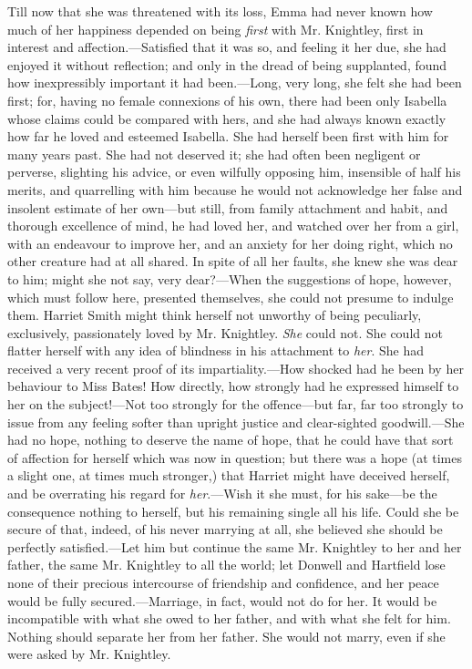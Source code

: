 Till now that she was threatened with its loss, Emma had never known how much of her happiness depended on being {\em first} with Mr. Knightley, first in interest and affection.---Satisfied that it was so, and feeling it her due, she had enjoyed it without reflection; and only in the dread of being supplanted, found how inexpressibly important it had been.---Long, very long, she felt she had been first; for, having no female connexions of his own, there had been only Isabella whose claims could be compared with hers, and she had always known exactly how far he loved and esteemed Isabella. She had herself been first with him for many years past. She had not deserved it; she had often been negligent or perverse, slighting his advice, or even wilfully opposing him, insensible of half his merits, and quarrelling with him because he would not acknowledge her false and insolent estimate of her own---but still, from family attachment and habit, and thorough excellence of mind, he had loved her, and watched over her from a girl, with an endeavour to improve her, and an anxiety for her doing right, which no other creature had at all shared. In spite of all her faults, she knew she was dear to him; might she not say, very dear?---When the suggestions of hope, however, which must follow here, presented themselves, she could not presume to indulge them. Harriet Smith might think herself not unworthy of being peculiarly, exclusively, passionately loved by Mr. Knightley. {\em She} could not. She could not flatter herself with any idea of blindness in his attachment to {\em her}. She had received a very recent proof of its impartiality.---How shocked had he been by her behaviour to Miss Bates! How directly, how strongly had he expressed himself to her on the subject!---Not too strongly for the offence---but far, far too strongly to issue from any feeling softer than upright justice and clear-sighted goodwill.---She had no hope, nothing to deserve the name of hope, that he could have that sort of affection for herself which was now in question; but there was a hope (at times a slight one, at times much stronger,) that Harriet might have deceived herself, and be overrating his regard for {\em her}.---Wish it she must, for his sake---be the consequence nothing to herself, but his remaining single all his life. Could she be secure of that, indeed, of his never marrying at all, she believed she should be perfectly satisfied.---Let him but continue the same Mr. Knightley to her and her father, the same Mr. Knightley to all the world; let Donwell and Hartfield lose none of their precious intercourse of friendship and confidence, and her peace would be fully secured.---Marriage, in fact, would not do for her. It would be incompatible with what she owed to her father, and with what she felt for him. Nothing should separate her from her father. She would not marry, even if she were asked by Mr. Knightley.

